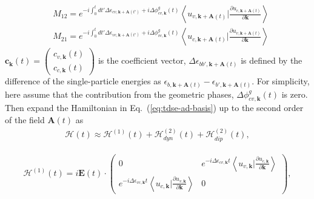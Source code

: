 \begin{align}
       & M_{12} = e^{-i\int^t_0dt' \Delta \epsilon_{cv,\mathbf k+ \mathbf A(t')}+i \Delta \phi^g_{cv,\mathbf k}(t)} 
  \left \langle u_{v,\mathbf k+\mathbf A(t)}\Big |\frac{\partial u_{c,\mathbf k+\mathbf A(t)}}{\partial
  \mathbf k} \right \rangle\\ 
       &  M_{21} = e^{-i\int^t_0dt' \Delta \epsilon_{vc,\mathbf k+ \mathbf A(t')}+i \Delta \phi^g_{vc,\mathbf k}(t)} 
  \left \langle u_{c,\mathbf k+\mathbf A(t)}\Big |\frac{\partial u_{v,\mathbf k+\mathbf A(t)}}{\partial
  \mathbf k} \right \rangle
\end{align}
$\mathbf c_{\mathbf k}(t) = \left(
    \begin{array}{cc}
      c_{v,\mathbf k}(t) \\
      c_{c,\mathbf k}(t)
    \end{array}
    \right)$ is the coefficient vector,  $\Delta\epsilon_{bb',\mathbf k+ \mathbf A(t)}$ is defined by the difference of the single-particle energies as $\epsilon_{b,\mathbf k+ \mathbf A(t)}-\epsilon_{b',\mathbf k+ \mathbf A(t)}$. For simplicity, here assume that the contribution from the geometric phases, $\Delta \phi^g_{cv,\mathbf k}(t)$ is zero. Then expand the Hamiltonian in Eq.~(\ref{eq:tdse-ad-basis}) up to the second order of the field $\mathbf A(t)$ as
\begin{align}
\mathcal{H}(t)\approx \mathcal{H}^{(1)}(t) + \mathcal{H}^{(2)}_{dyn}(t) + \mathcal{H}^{(2)}_{dip}(t),
\end{align}

\begin{align}
\mathcal{H}^{(1)}(t) = i \mathbf E(t)\cdot 
\left(
    \begin{array}{cc}
      0 & 
      e^{-i \Delta \epsilon_{cv,\mathbf k}t} 
  \left \langle u_{v,\mathbf k}\Big |\frac{\partial u_{c,\mathbf k}}{\partial \mathbf k} \right \rangle \\
      e^{-i\Delta \epsilon_{vc,\mathbf k}t}
  \left \langle u_{c,\mathbf k}\Big |\frac{\partial u_{v,\mathbf k}}{\partial \mathbf k} \right \rangle &
      0
    \end{array}
    \right),
\end{align}

